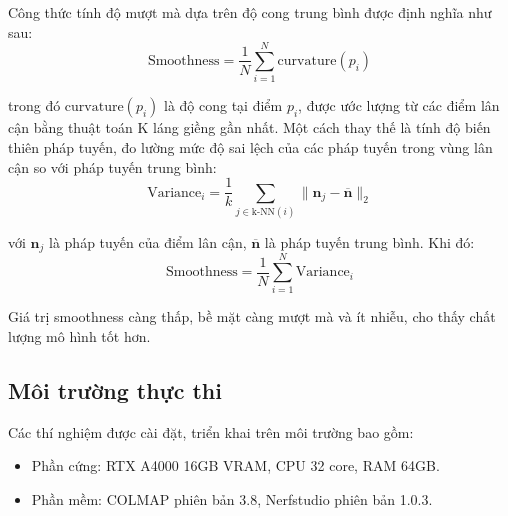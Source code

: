     Công thức tính độ mượt mà dựa trên độ cong trung bình được định nghĩa như sau:
    \begin{equation}
        \text{Smoothness} = \frac{1}{N} \sum_{i=1}^N \text{curvature}(p_i)
    \end{equation}

    trong đó \(\text{curvature}(p_i)\) là độ cong tại điểm \(p_i\), được ước lượng từ các điểm lân cận bằng thuật toán K láng giềng gần nhất. Một cách thay thế là tính độ biến thiên pháp tuyến, đo lường mức độ sai lệch của các pháp tuyến trong vùng lân cận so với pháp tuyến trung bình:
    \begin{equation}
        \text{Variance}_i = \frac{1}{k} \sum_{j \in \text{k-NN}(i)} \|\mathbf{n}_j - \overline{\mathbf{n}}\|_2
    \end{equation}

    với \(\mathbf{n}_j\) là pháp tuyến của điểm lân cận, \(\overline{\mathbf{n}}\) là pháp tuyến trung bình. Khi đó:
    \begin{equation}
        \text{Smoothness} = \frac{1}{N} \sum_{i=1}^N \text{Variance}_i
    \end{equation}

    Giá trị smoothness càng thấp, bề mặt càng mượt mà và ít nhiễu, cho thấy chất lượng mô hình tốt hơn.

    
    
    \subsection{Môi trường thực thi}
    \label{subsec:exp_environment}
        Các thí nghiệm được cài đặt, triển khai trên môi trường bao gồm:
        \begin{itemize}
            \item Phần cứng: RTX A4000 16GB VRAM, CPU 32 core, RAM 64GB.
            \item Phần mềm: COLMAP phiên bản 3.8, Nerfstudio phiên bản 1.0.3.
        \end{itemize}

